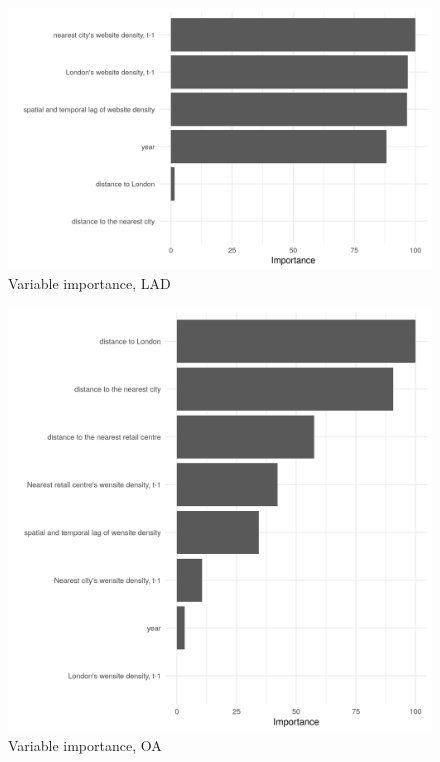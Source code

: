 \documentclass[
  authoryear,
  preprint,
  3p]{elsarticle}
\begin{document}
\begin{figure}[H]

{\centering \includegraphics[width=1\textwidth,height=\textheight]{../../outputs/rf/figures/varimp_LA.png}

}

\caption{\label{var.imp.LAD}Variable importance, LAD}

\end{figure}%

\begin{figure}[H]

{\centering \includegraphics[width=1\textwidth,height=\textheight]{../../outputs/rf/figures/varimp_OA.png}

}

\caption{\label{var.imp.OA}Variable importance, OA}

\end{figure}%
\end{document}
